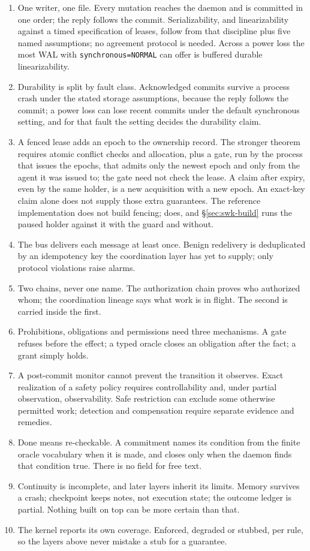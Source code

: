 \documentclass[11pt,a4paper]{article}
\theoremstyle{definition}
\theoremstyle{remark}
\begin{document}
\begin{enumerate}[leftmargin=1.6em,itemsep=2pt]
\item One writer, one file. Every mutation reaches the daemon and is committed in one
  order; the reply follows the commit. Serializability, and linearizability against
  a timed specification of leases, follow from that discipline plus five named
  assumptions; no agreement protocol is needed. Across a power loss the most WAL
  with \texttt{synchronous=NORMAL} can offer is buffered durable linearizability.
\item Durability is split by fault class. Acknowledged commits survive a process
  crash under the stated storage assumptions, because the reply follows the
  commit; a power loss can lose recent commits under the default synchronous
  setting, and for that fault the setting decides the durability claim.
\item A fenced lease adds an epoch to the ownership record. The stronger
  theorem requires atomic conflict checks and allocation, plus a gate, run by
  the process that issues the epochs, that admits only the newest epoch and only
  from the agent it was issued to; the gate need not check the lease. A claim
  after expiry, even by the same holder, is a new acquisition with a new epoch.
  An exact-key claim alone does not supply
  those extra guarantees. The reference implementation does not build fencing;
  \pdkernelname{} does, and \S\ref{sec:swk-build} runs the paused holder
  against it with the guard and without.
\item The bus delivers each message at least once. Benign redelivery is deduplicated by an
  idempotency key the coordination layer has yet to supply; only protocol violations raise alarms.
\item Two chains, never one name. The authorization chain proves who authorized whom;
  the coordination lineage says what work is in flight. The second is carried inside
  the first.
\item Prohibitions, obligations and permissions need three mechanisms. A gate refuses
  before the effect; a typed oracle closes an obligation after the fact; a grant simply
  holds.
\item A post-commit monitor cannot prevent the transition it observes.
  Exact realization of a safety policy requires controllability and, under
  partial observation, observability. Safe restriction can exclude some
  otherwise permitted work; detection and compensation require separate
  evidence and remedies.
\item Done means re-checkable. A commitment names its condition from the
  finite oracle vocabulary when it is made, and closes only when the daemon
  finds that condition true. There is no field for free text.
\item Continuity is incomplete, and later layers inherit its limits. Memory survives a crash; checkpoint keeps notes,
  not execution state; the outcome ledger is partial. Nothing built on top can be more
  certain than that.
\item The kernel reports its own coverage. Enforced, degraded or stubbed, per rule, so
  the layers above never mistake a stub for a guarantee.
\end{enumerate}
\end{document}
